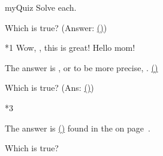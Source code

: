 \documentclass{article}
\begin{document}
\begin{quiz*}{myQuiz}
Solve each.
\begin{questions}

    \item Which is true? (Answer: \hyperref[rtAns3]{()})
\begin{manswers}*{1}
\bChoices[random=true,label=rtAns]
    \label{rtAns3}\eAns
     Wow, , this is great!\eAns
    \eAns
    \eAns
\eFreeze
     Hello mom!\eAns
\eChoices
\end{manswers}
\begin{solution}
The answer is , or to be more precise,
. \hyperref[rtAns3]{()}
\end{solution}

    \item Which is true? (Ans: \hyperref[rtAns1]{()})
\begin{answers}*{3}
    \bChoices[random,nCols=2]
        \label{rtAns1} \eAns
         \eAns
         \eAns
         \eAns
    \eChoices
\end{answers}
\begin{solution}
The answer is \hyperref[rtAns1]{()} found in the
 on page~\pageref{rtAns1}.
\end{solution}

    \item Which is true?
\begin{answers}{3}
    \bChoices[random]
         \eAns
         \eAns
         \eAns
         \eAns
    \eChoices
\end{answers}
\end{questions}
\end{quiz*}
\end{document}
